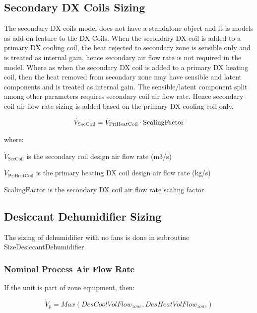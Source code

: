 \subsection{Secondary DX Coils Sizing}\label{secondary-dx-coils-sizing}

The secondary DX coils model does not have a standalone object and it is models as add-on feature to the DX Coils. When the secondary DX coil is added to a primary DX cooling coil, the heat rejected to secondary zone is sensible only and is treated as internal gain, hence secondary air flow rate is not required in the model. Where as when the secondary DX coil is added to a primary DX heating coil, then the heat removed from secondary zone may have sensible and latent components and is treated as internal gain. The sensible/latent component split among other parameters requires secondary coil air flow rate. Hence secondary coil air flow rate sizing is added based on the primary DX cooling coil only.

\begin{equation}
  \dot{V}_{\rm{SecCoil}} = \dot{V}_{\rm{PriHeatCoil}} \cdot \text{ScalingFactor}
\end{equation}

where:

\(\dot{V}_\text{SecCoil}\) is the secondary coil design air flow rate (m3/s)

\(\dot{V}_\text{PriHeatCoil}\) is the primary heating DX coil design air flow rate (kg/s)

\(\text{ScalingFactor}\) is the secondary DX coil air flow rate scaling factor.

\subsection{Desiccant Dehumidifier Sizing}\label{desiccant-dehumidifier-sizing}

The sizing of dehumidifier with no fans is done in subroutine SizeDesiccantDehumidifier.

\subsubsection{Nominal Process Air Flow Rate}\label{nominal-process-air-flow-rate}

If the unit is part of zone equipment, then:

\begin{equation}
{\dot V_p} = Max\left( {DesCoolVolFlo{w_{zone}},DesHeatVolFlo{w_{zone}}} \right)
\end{equation}

